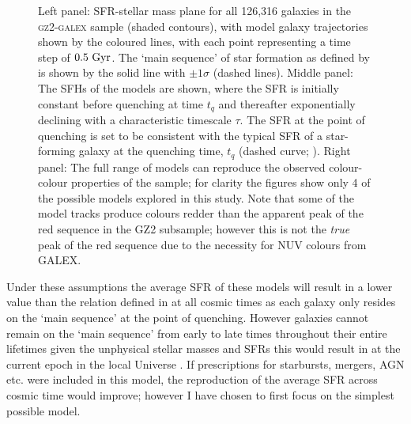 \begin{figure}
\caption[SFH models in observational planes]{Left panel: SFR-stellar mass plane for all 126,316 galaxies in the \textsc{gz2-galex} sample (shaded contours), with model galaxy trajectories shown by the coloured lines, with each point representing a time step of $0.5~\rm{Gyr}$.  The `main sequence' of star formation as defined by \citet{peng10} is shown by the solid line with $\pm1\sigma$ (dashed lines). Middle panel: The SFHs of the models are shown, where the SFR is initially constant before quenching at time $t_q$ and thereafter exponentially declining with a characteristic timescale $\tau$. The SFR at the point of quenching is set to be consistent with the typical SFR of a star-forming galaxy at the quenching time, $t_q$ (dashed curve; \citealt{peng10}). Right panel: The full range of models can reproduce the observed colour-colour properties of the sample; for clarity the figures show only 4 of the possible models explored in this study. Note that some of the model tracks produce colours redder than the apparent peak of the red sequence in the GZ2 subsample; however this is not the \emph{true} peak of the red sequence due to the necessity for NUV colours from GALEX.}
\label{sfr_mass_col}
\end{figure}
  
Under these assumptions the average SFR of these models will result in a lower value than the relation defined in \citet{peng10} at all cosmic times as each galaxy only resides on the `main sequence' at the point of quenching. However galaxies cannot remain on the `main sequence' from early to late times throughout their entire lifetimes given the unphysical stellar masses and SFRs this would result in at the current epoch in the local Universe \citep{bethermin12, Heinis14}. If prescriptions for starbursts, mergers, AGN etc. were included in this model, the reproduction of the average SFR across cosmic time would improve; however I have chosen to first focus on the simplest possible model.

